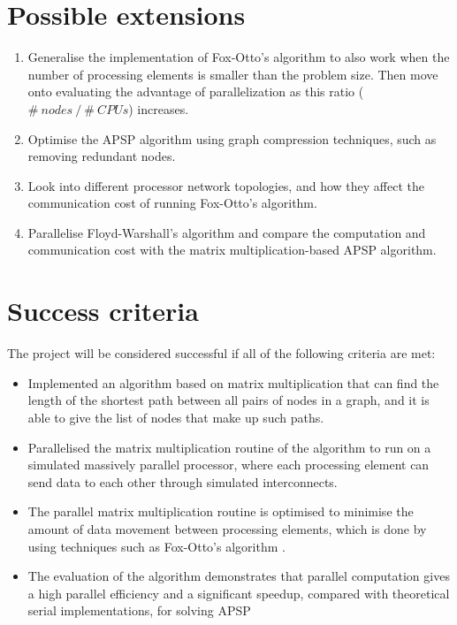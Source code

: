 \documentclass{article}
\begin{document}
\section*{Possible extensions}%
\label{sec:Possible extensions}

\begin{enumerate}
    \item Generalise the implementation of Fox-Otto's algorithm to also work when
        the number of processing elements is smaller than the problem size.
        Then move onto evaluating the advantage of parallelization as this ratio
        ( $\#~nodes~/~\#~CPUs$) increases.
    \item Optimise the APSP algorithm using graph compression techniques, such as
        removing redundant nodes.
    \item Look into different processor network topologies, and how they affect
        the communication cost of running Fox-Otto's algorithm.
    \item Parallelise Floyd-Warshall's algorithm and compare the
        computation and communication cost with the matrix multiplication-based
        APSP algorithm.
\end{enumerate}

\section*{Success criteria}%
\label{sec:Success criteria}

The project will be considered successful if all of the following criteria are met:
\begin{itemize}
    \item Implemented an algorithm based on matrix multiplication that can find the
        length of the shortest path between all pairs of nodes in a graph, and it is able
        to give the list of nodes that make up such paths.
    \item Parallelised the matrix multiplication routine of the algorithm to run on a simulated
        massively parallel processor, where each processing element can send data to each
        other through simulated interconnects.
    \item The parallel matrix multiplication routine is optimised to minimise the
        amount of data movement between processing elements, which is done
        by using techniques such as Fox-Otto's algorithm \cite{fox}.
    \item The evaluation of the algorithm demonstrates that parallel computation gives
        a high parallel efficiency and a significant speedup, compared with theoretical
        serial implementations, for solving APSP
\end{itemize}
\end{document}
